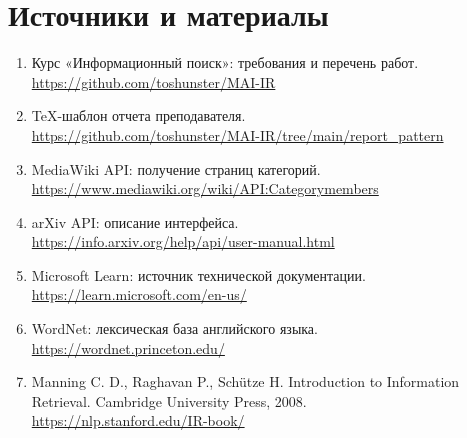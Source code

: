 \documentclass[pdf,unicode,12pt,a4paper,oneside,fleqn]{article}
\begin{document}
\section*{Источники и материалы}
\begin{enumerate}\setlength{\itemsep}{2pt}\setlength{\parskip}{0pt}
\item Курс «Информационный поиск»: требования и перечень работ.\\
\url{https://github.com/toshunster/MAI-IR}
\item TeX-шаблон отчета преподавателя.\\
\url{https://github.com/toshunster/MAI-IR/tree/main/report_pattern}
\item MediaWiki API: получение страниц категорий.\\
\url{https://www.mediawiki.org/wiki/API:Categorymembers}
\item arXiv API: описание интерфейса.\\
\url{https://info.arxiv.org/help/api/user-manual.html}
\item Microsoft Learn: источник технической документации.\\
\url{https://learn.microsoft.com/en-us/}
\item WordNet: лексическая база английского языка.\\
\url{https://wordnet.princeton.edu/}
\item Manning C. D., Raghavan P., Schütze H. Introduction to Information
Retrieval. Cambridge University Press, 2008.\\
\url{https://nlp.stanford.edu/IR-book/}
\end{enumerate}
\end{document}
